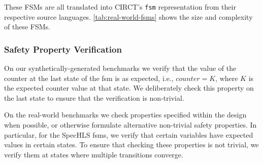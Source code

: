 \documentclass[acmsmall,screen,review]{acmart}
\begin{document}
These FSMs are all translated into CIRCT's \texttt{fsm} representation from their respective source languages.
\autoref{tab:real-world-fsms} shows the size and complexity of these FSMs.

\subsubsection{Safety Property Verification}

On our synthetically-generated benchmarks we verify that
the value of the counter at the last state of the \ac{fsm} is as expected, i.e., 
$counter = K$, where $K$ is the expected counter value at that state. 
We deliberately check this property on the last state to ensure that the verification is 
non-trivial. 

On the real-world benchmarks we check properties specified within the design when possible, 
or otherwise formulate alternative non-trivial safety properties. 
In particular, for the SpecHLS \acp{fsm}, we verify that certain variables have expected values in certain states.
To ensure that checking these properties is not trivial, we verify them at states 
where multiple transitions converge. 
\end{document}

